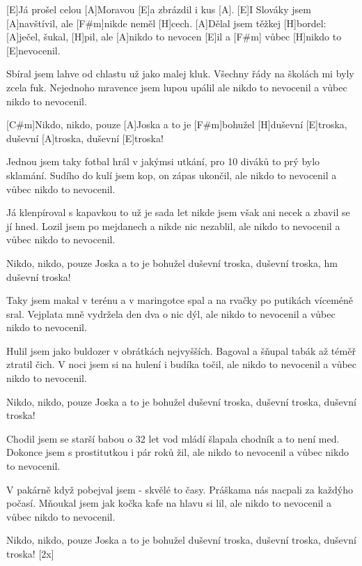 
[E]Já prošel celou [A]Moravou
[E]a zbrázdil i kus [A].
[E]I Slováky jsem [A]navštívil,
ale [F#m]nikde neměl [H]cech.
[A]Dělal jsem těžkej [H]bordel:
[A]ječel, šukal, [H]pil,
ale [A]nikdo to nevocen [E]il
a [F#m] vůbec [H]nikdo to [E]nevocenil.

Sbíral jsem lahve od chlastu
už jako malej kluk.
Všechny řády na školách
mi byly zcela fuk.
Nejednoho mravence
jsem lupou upálil
ale nikdo to nevocenil
a vůbec nikdo to nevocenil.

[C#m]Nikdo, nikdo, pouze [A]Joska
a to je [F#m]bohužel [H]duševní [E]troska,
duševní [A]troska, duševní [E]troska!

Jednou jsem taky fotbal hrál
v jakýmsi utkání,
pro 10 diváků to
prý bylo sklamání.
Sudího do kulí jsem kop,
on zápas ukončil,
ale nikdo to nevocenil
a vůbec nikdo to nevocenil.


Já klenpíroval s kapavkou
to už je sada let
nikde jsem však ani necek
a zbavil se jí hned.
Lozil jsem po mejdanech
a nikde nic nezablil,
ale nikdo to nevocenil
a vůbec nikdo to nevocenil.

Nikdo, nikdo, pouze Joska
a to je bohužel duševní troska,
duševní troska, hm duševní troska!

Taky jsem makal v terénu
a v maringotce spal
a na rvačky po putikách
víceméně sral.
Vejplata mně vydržela
den dva o nic dýl,
ale nikdo to nevocenil
a vůbec nikdo to nevocenil.

Hulil jsem jako buldozer
v obrátkách nejvyšších.
Bagoval a šňupal tabák
až téměř ztratil čich.
V noci jsem si na hulení
i budíka točil,
ale nikdo to nevocenil
a vůbec nikdo to nevocenil.

Nikdo, nikdo, pouze Joska
a to je bohužel duševní troska,
duševní troska, duševní troska!


Chodil jsem se starší babou
o 32 let
vod mládí šlapala chodník
a to není med.
Dokonce jsem s prostitutkou
i pár roků žil,
ale nikdo to nevocenil
a vůbec nikdo to nevocenil.

V pakárně když pobejval jsem
- skvělé to časy.
Práškama nás nacpali
za každýho počasí.
Mňoukal jsem jak kočka
kafe na hlavu si lil,
ale nikdo to nevocenil
a vůbec nikdo to nevocenil.

Nikdo, nikdo, pouze Joska
a to je bohužel duševní troska,
duševní troska, duševní troska! [2x]


